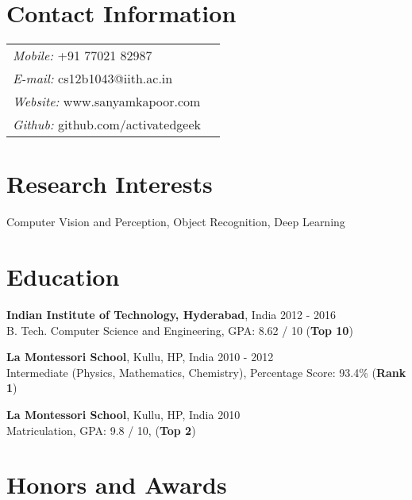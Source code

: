 \documentclass[margin,line]{res}
\begin{document}

\begin{resume}

\section{\sc Contact Information}

  \vspace{.05in}

  \begin{tabular}{@{}p{2.9in}p{6in}}
	{\it Mobile:}  +91 77021 82987 \\
	{\it E-mail:}  cs12b1043@iith.ac.in \\
	{\it Website:} www.sanyamkapoor.com \\
	{\it Github:} github.com/activatedgeek
  \end{tabular}

\section{\sc Research Interests}
  Computer Vision and Perception, Object Recognition, Deep Learning

\section{\sc Education}

  {\bf Indian Institute of Technology, Hyderabad}, India \hfill 2012 - 2016 \\
  	B. Tech. Computer Science and Engineering,
	GPA: 8.62 / 10 ({\bf Top 10})

  \vspace*{-2.5mm}

  {\bf La Montessori School}, Kullu, HP, India \hfill 2010 - 2012 \\
	Intermediate (Physics, Mathematics, Chemistry),
    Percentage Score: 93.4\% ({\bf Rank 1})

  \vspace*{-2.5mm}

  {\bf La Montessori School}, Kullu, HP, India \hfill 2010 \\
	Matriculation,
    GPA: 9.8 / 10, ({\bf Top 2})

\section{\sc Honors and Awards}


\end{resume}
\end{document}
